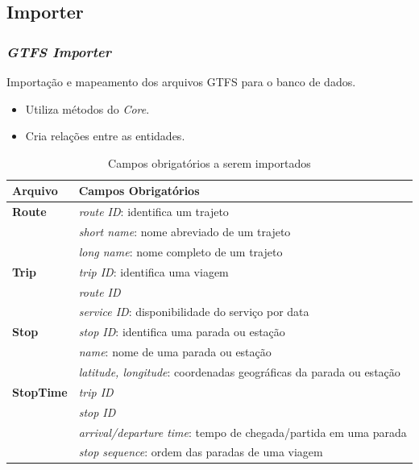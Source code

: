 \subsection{Importer}
\frame
{
\frametitle{\emph{GTFS Importer}}
Importação e mapeamento dos arquivos GTFS para o banco de dados.
\begin{itemize}
\item Utiliza métodos do \emph{Core}.
\item Cria relações entre as entidades.
\end{itemize}


\begin{table}
	\tiny
	\caption{Campos obrigatórios a serem importados}
	\begin{tabular}{ll}
		\hline
		\textbf{Arquivo} & \textbf{Campos Obrigatórios} \\
		\hline
		\textbf{Route} & \emph{route ID}: identifica um trajeto \\
				    & \emph{short name}: nome abreviado de um trajeto \\
				    & \emph{long name}: nome completo de um trajeto \\
		\textbf{Trip} & \emph{trip ID}: identifica uma viagem \\ 
				& \emph{route ID} \\ 
				& \emph{service ID}: disponibilidade do serviço por data \\
		\textbf{Stop} & \emph{stop ID}: identifica uma parada ou estação \\
				 & \emph{name}: nome de uma parada ou estação \\
				 & \emph{latitude, longitude}: coordenadas geográficas da parada ou estação \\
		\textbf{StopTime} & \emph{trip ID} \\
				         & \emph{stop ID} \\
				         & \emph{arrival/departure time}: tempo de chegada/partida em uma parada \\
				         & \emph{stop sequence}: ordem das paradas de uma viagem \\
		\hline
	\end{tabular}
\end{table}
}

